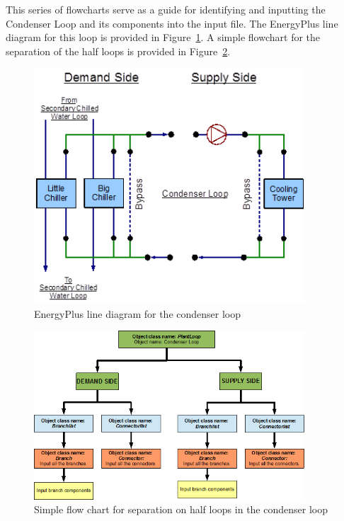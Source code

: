This series of flowcharts serve as a guide for identifying and inputting the Condenser Loop and its components into the input file. The EnergyPlus line diagram for this loop is provided in Figure~\ref{fig:energyplus-line-diagram-for-the-condenser-001}. A simple flowchart for the separation of the half loops is provided in Figure~\ref{fig:simple-flow-chart-for-separation-on-half-001}.

\begin{figure}[hbtp] %
\centering
\includegraphics[width=0.9\textwidth, height=0.9\textheight, keepaspectratio=true]{media/image117.png}
\caption{EnergyPlus line diagram for the condenser loop \protect \label{fig:energyplus-line-diagram-for-the-condenser-001}}
\end{figure}

\begin{figure}[hbtp] %
\centering
\includegraphics[width=0.9\textwidth, height=0.9\textheight, keepaspectratio=true]{media/image118.png}
\caption{Simple flow chart for separation on half loops in the condenser loop \protect \label{fig:simple-flow-chart-for-separation-on-half-001}}
\end{figure}

